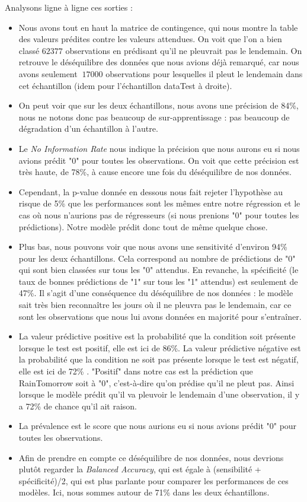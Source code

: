 \documentclass{article}
\begin{document}
Analysons ligne à ligne ces sorties : 
\begin{itemize}
    \item Nous avons tout en haut la matrice de contingence, qui nous montre la table des valeurs prédites contre les valeurs attendues. On voit que l'on a bien classé $62377$ observations en prédisant qu'il ne pleuvrait pas le lendemain. On retrouve le déséquilibre des données que nous avions déjà remarqué, car nous avons seulement $~17000$ observations pour lesquelles il pleut le lendemain dans cet échantillon (idem pour l'échantillon dataTest à droite).
    \item On peut voir que sur les deux échantillons, nous avons une précision de 84\%, nous ne notons donc pas beaucoup de sur-apprentissage : pas beaucoup de dégradation d'un échantillon à l'autre.
    \item Le \emph{No Information Rate} nous indique la précision que nous aurons eu si nous avions prédit "0" pour toutes les observations. On voit que cette précision est très haute, de 78\%, à cause encore une fois du déséquilibre de nos données. 
    \item Cependant, la p-value donnée en dessous nous fait rejeter l'hypothèse au risque de 5\% que les performances sont les mêmes entre notre régression et le cas où nous n'aurions pas de régresseurs (si nous prenions "0" pour toutes les prédictions). Notre modèle prédit donc tout de même quelque chose.
    \item Plus bas, nous pouvons voir que nous avons une sensitivité d'environ 94\% pour les deux échantillons. Cela correspond au nombre de prédictions de "0" qui sont bien classées sur tous les "0" attendus. En revanche, la spécificité (le taux de bonnes prédictions de "1" sur tous les "1" attendus) est seulement de 47\%. Il s'agit d'une conséquence du déséquilibre de nos données : le modèle sait très bien reconnaître les jours où il ne pleuvra pas le lendemain, car ce sont les observations que nous lui avons données en majorité pour s'entraîner.
    \item La valeur prédictive positive est la probabilité que la condition soit présente lorsque le test est positif, elle est ici de 86\%. La valeur prédictive négative est la probabilité que la condition ne soit pas présente lorsque le test est négatif, elle est ici de 72\% \cite{frwiki:183891886}. "Positif" dans notre cas est la prédiction que RainTomorrow soit à "0", c'est-à-dire qu'on prédise qu'il ne pleut pas. Ainsi lorsque le modèle prédit qu'il va pleuvoir le lendemain d'une observation, il y a 72\% de chance qu'il ait raison.
    \item La prévalence est le score que nous aurions eu si nous avions prédit "0" pour toutes les observations.
    \item Afin de prendre en compte ce déséquilibre de nos données, nous devrions plutôt regarder la \emph{Balanced Accuracy}, qui est égale à (sensibilité + spécificité)/2, qui est plus parlante pour comparer les performances de ces modèles. Ici, nous sommes autour de 71\% dans les deux échantillons.
\end{itemize}
\end{document}

